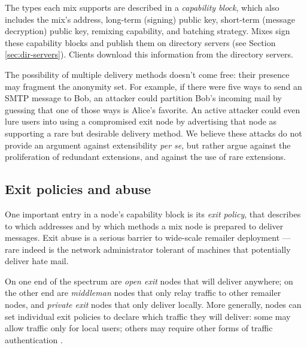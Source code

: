 \documentclass[final]{ieee}
\begin{document}
The types each mix supports are described in a \emph{capability block},
which also includes the mix's address, long-term (signing) public key,
short-term (message decryption) public key, remixing capability,
and batching strategy. Mixes sign these capability blocks
and publish them on directory servers (see Section \ref{sec:dir-servers}).
Clients download this information from the directory servers.

%

The possibility of multiple delivery methods doesn't come free: their
presence may fragment the anonymity set.  For example, if there were five
ways to send an SMTP message to Bob, an attacker could partition Bob's
incoming mail by guessing that one of those ways is Alice's favorite.
An active attacker could even lure users into using a compromised
exit node by advertising that node as supporting a
rare but desirable delivery method.
We believe these attacks do not provide an argument against
extensibility \emph{per se}, but rather argue against the proliferation
of redundant extensions, and against the use of rare extensions.  

\subsection{Exit policies and abuse}
\label{subsec:exitpolicies}

One important entry in a node's capability block is its \emph{exit
policy}, that describes to which addresses and by which methods a mix node is
prepared to deliver messages. Exit abuse is a serious barrier to
wide-scale remailer deployment 
--- rare indeed is the network administrator tolerant of machines that
potentially deliver hate mail. %

On one end of the spectrum are \emph{open exit} nodes that will
deliver anywhere; on the other end are \emph{middleman} nodes that
only relay traffic to other remailer nodes, and \emph{private exit}
nodes that only deliver locally. More generally, nodes can set
individual exit policies to declare which traffic they will deliver:
some may allow traffic only for local users; others may require
other forms of traffic authentication
\cite{onion-discex00}.
\end{document}
